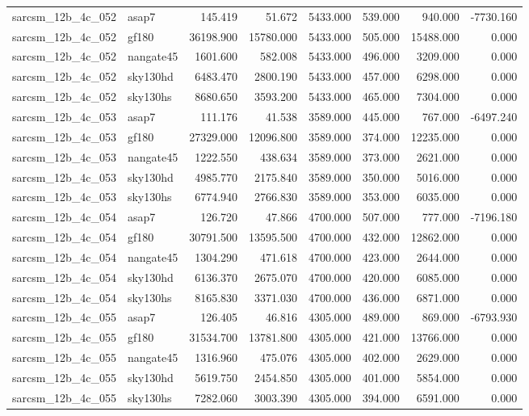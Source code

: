 \begin{tabular}{llrrrrrr}
sarcsm\_12b\_4c\_052 & asap7 & 145.419 & 51.672 & 5433.000 & 539.000 & 940.000 & -7730.160 \\
sarcsm\_12b\_4c\_052 & gf180 & 36198.900 & 15780.000 & 5433.000 & 505.000 & 15488.000 & 0.000 \\
sarcsm\_12b\_4c\_052 & nangate45 & 1601.600 & 582.008 & 5433.000 & 496.000 & 3209.000 & 0.000 \\
sarcsm\_12b\_4c\_052 & sky130hd & 6483.470 & 2800.190 & 5433.000 & 457.000 & 6298.000 & 0.000 \\
sarcsm\_12b\_4c\_052 & sky130hs & 8680.650 & 3593.200 & 5433.000 & 465.000 & 7304.000 & 0.000 \\
sarcsm\_12b\_4c\_053 & asap7 & 111.176 & 41.538 & 3589.000 & 445.000 & 767.000 & -6497.240 \\
sarcsm\_12b\_4c\_053 & gf180 & 27329.000 & 12096.800 & 3589.000 & 374.000 & 12235.000 & 0.000 \\
sarcsm\_12b\_4c\_053 & nangate45 & 1222.550 & 438.634 & 3589.000 & 373.000 & 2621.000 & 0.000 \\
sarcsm\_12b\_4c\_053 & sky130hd & 4985.770 & 2175.840 & 3589.000 & 350.000 & 5016.000 & 0.000 \\
sarcsm\_12b\_4c\_053 & sky130hs & 6774.940 & 2766.830 & 3589.000 & 353.000 & 6035.000 & 0.000 \\
sarcsm\_12b\_4c\_054 & asap7 & 126.720 & 47.866 & 4700.000 & 507.000 & 777.000 & -7196.180 \\
sarcsm\_12b\_4c\_054 & gf180 & 30791.500 & 13595.500 & 4700.000 & 432.000 & 12862.000 & 0.000 \\
sarcsm\_12b\_4c\_054 & nangate45 & 1304.290 & 471.618 & 4700.000 & 423.000 & 2644.000 & 0.000 \\
sarcsm\_12b\_4c\_054 & sky130hd & 6136.370 & 2675.070 & 4700.000 & 420.000 & 6085.000 & 0.000 \\
sarcsm\_12b\_4c\_054 & sky130hs & 8165.830 & 3371.030 & 4700.000 & 436.000 & 6871.000 & 0.000 \\
sarcsm\_12b\_4c\_055 & asap7 & 126.405 & 46.816 & 4305.000 & 489.000 & 869.000 & -6793.930 \\
sarcsm\_12b\_4c\_055 & gf180 & 31534.700 & 13781.800 & 4305.000 & 421.000 & 13766.000 & 0.000 \\
sarcsm\_12b\_4c\_055 & nangate45 & 1316.960 & 475.076 & 4305.000 & 402.000 & 2629.000 & 0.000 \\
sarcsm\_12b\_4c\_055 & sky130hd & 5619.750 & 2454.850 & 4305.000 & 401.000 & 5854.000 & 0.000 \\
sarcsm\_12b\_4c\_055 & sky130hs & 7282.060 & 3003.390 & 4305.000 & 394.000 & 6591.000 & 0.000 \\

\end{tabular}
